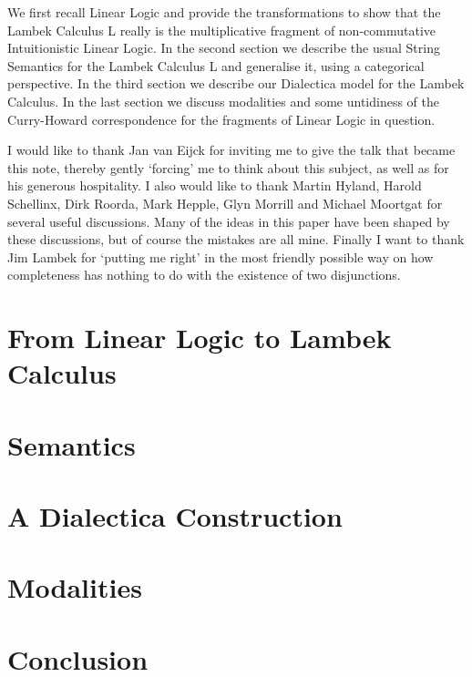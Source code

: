 \documentclass{article}
\begin{document}
We first recall Linear Logic and provide the transformations to show that the Lambek Calculus L really is the multiplicative fragment of non-commutative Intuitionistic Linear Logic. In the second section we describe the usual String Semantics for the Lambek Calculus L and generalise it, using a categorical perspective. In the third section we describe our Dialectica model for the Lambek Calculus. In the last section we discuss modalities and some untidiness of the Curry-Howard correspondence for the fragments of Linear Logic in question.

I would like to thank Jan van Eijck for inviting me to give the talk that became
this note, thereby gently `forcing' me to think about this subject, as well as for his
generous hospitality. I also would like to thank Martin Hyland, Harold Schellinx,
Dirk Roorda, Mark Hepple, Glyn Morrill and Michael Moortgat for several useful
discussions. Many of the ideas in this paper have been shaped by these discussions,
but of course the mistakes are all mine. Finally I want to thank Jim Lambek for     `putting me right'
 in the most friendly possible way on how completeness has nothing to do with the existence of two disjunctions.

\section{From Linear Logic to Lambek Calculus}

\section{Semantics}

\section{A Dialectica Construction}

\section{Modalities}
\section{Conclusion}




\end{document}

